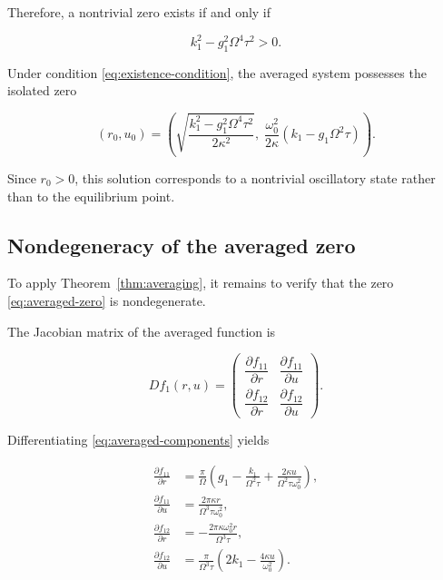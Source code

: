\documentclass[11pt,reqno]{amsart}
\theoremstyle{plain}
\theoremstyle{definition}
\theoremstyle{remark}
\begin{document}
Therefore, a nontrivial zero exists if and only if

\begin{equation}
\label{eq:existence-condition}
\boxed{
k_1^2-g_1^2\Omega^4\tau^2>0.
}
\end{equation}

Under condition
\eqref{eq:existence-condition},
the averaged system possesses the isolated zero

\begin{equation}
\label{eq:averaged-zero}
\boxed{
(r_0,u_0)
=
\left(
\sqrt{
\frac{
k_1^2-g_1^2\Omega^4\tau^2
}
{2\kappa^2}
},
\;
\frac{\omega_0^2}{2\kappa}
\left(
k_1-g_1\Omega^2\tau
\right)
\right).
}
\end{equation}

Since $r_0>0$, this solution corresponds to a nontrivial oscillatory
state rather than to the equilibrium point.


\subsection{Nondegeneracy of the averaged zero}

To apply Theorem~\ref{thm:averaging}, it remains to verify that the
zero \eqref{eq:averaged-zero} is nondegenerate.

The Jacobian matrix of the averaged function is

\[
Df_1(r,u)
=
\begin{pmatrix}
\dfrac{\partial f_{11}}{\partial r}
&
\dfrac{\partial f_{11}}{\partial u}
\\[4mm]
\dfrac{\partial f_{12}}{\partial r}
&
\dfrac{\partial f_{12}}{\partial u}
\end{pmatrix}.
\]

Differentiating \eqref{eq:averaged-components} yields

\begin{align}
\frac{\partial f_{11}}{\partial r}
&=
\frac{\pi}{\Omega}
\left(
g_1
-\frac{k_1}{\Omega^2\tau}
+\frac{2\kappa u}
{\Omega^2\tau\omega_0^2}
\right),
\nonumber\\[2mm]
\frac{\partial f_{11}}{\partial u}
&=
\frac{2\pi\kappa r}
{\Omega^3\tau\omega_0^2},
\nonumber\\[2mm]
\frac{\partial f_{12}}{\partial r}
&=
-\frac{2\pi\kappa\omega_0^2r}
{\Omega^3\tau},
\nonumber\\[2mm]
\frac{\partial f_{12}}{\partial u}
&=
\frac{\pi}{\Omega^3\tau}
\left(
2k_1
-\frac{4\kappa u}{\omega_0^2}
\right).
\label{eq:partial-derivatives}
\end{align}
\end{document}
